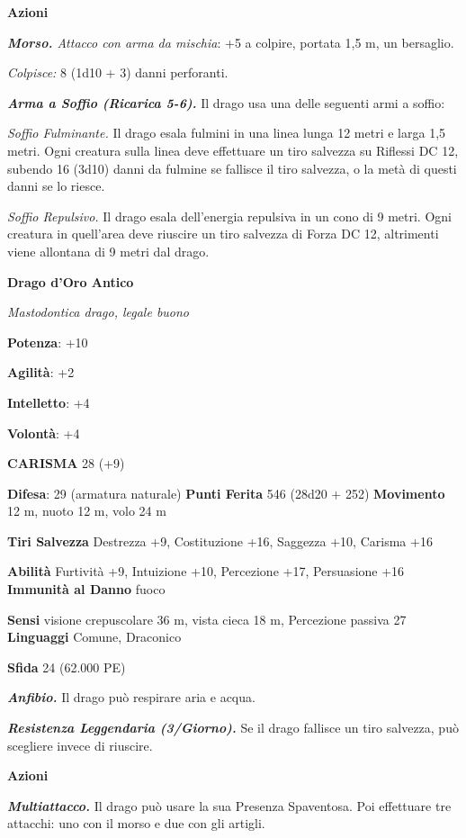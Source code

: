 \begin{multicols}{2}
\textbf{Azioni}

\emph{\textbf{Morso.} Attacco con arma da mischia}: +5 a colpire,
portata 1,5 m, un bersaglio.

\emph{Colpisce:} 8 (1d10 + 3) danni perforanti.

\emph{\textbf{Arma a Soffio (Ricarica 5-6).}} Il drago usa una delle
seguenti armi a soffio:

\emph{Soffio Fulminante.} Il drago esala fulmini in una linea lunga 12
metri e larga 1,5 metri. Ogni creatura sulla linea deve effettuare un
tiro salvezza su Riflessi DC 12, subendo 16 (3d10) danni da fulmine se
fallisce il tiro salvezza, o la metà di questi danni se lo riesce.

\emph{Soffio Repulsivo.} Il drago esala dell'energia repulsiva in un
cono di 9 metri. Ogni creatura in quell'area deve riuscire un tiro
salvezza di Forza DC 12, altrimenti viene allontana di 9 metri dal
drago.

\textbf{Drago d'Oro Antico}

\emph{Mastodontica drago, legale buono}

\textbf{Potenza}: +10

\textbf{Agilità}: +2

\textbf{Intelletto}: +4

\textbf{Volontà}: +4

\textbf{CARISMA} 28 (+9)

\textbf{Difesa}: 29 (armatura naturale) \textbf{Punti Ferita}
546 (28d20 + 252) \textbf{Movimento} 12 m, nuoto 12 m, volo 24 m

\textbf{Tiri Salvezza} Destrezza +9, Costituzione +16, Saggezza +10,
Carisma +16

\textbf{Abilità} Furtività +9, Intuizione +10, Percezione +17,
Persuasione +16 \textbf{Immunità al Danno} fuoco

\textbf{Sensi} visione crepuscolare 36 m, vista cieca 18 m, Percezione passiva
27 \textbf{Linguaggi} Comune, Draconico

\textbf{Sfida} 24 (62.000 PE)

\emph{\textbf{Anfibio.}} Il drago può respirare aria e acqua.

\emph{\textbf{Resistenza Leggendaria (3/Giorno).}} Se il drago fallisce
un tiro salvezza, può scegliere invece di riuscire.

\textbf{Azioni}

\emph{\textbf{Multiattacco.}} Il drago può usare la sua Presenza
Spaventosa. Poi effettuare tre attacchi: uno con il morso e due con gli
artigli.


\end{multicols}
